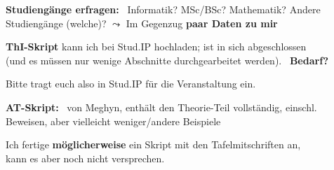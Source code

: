 \begin{frame}
{        \par\medskip
        \textbf{Studiengänge erfragen:}~ Informatik? MSc/BSc? Mathematik? Andere Studiengänge (welche)?
        \qquad
        $\leadsto$ Im Gegenzug \textbf{paar Daten zu mir}
        
        \par\medskip
        \textbf{ThI-Skript} kann ich bei Stud.IP hochladen; ist in sich abgeschlossen \\
        (und es müssen nur wenige Abschnitte durchgearbeitet werden).~ \textbf{Bedarf?}
        
        \par\smallskip
        Bitte tragt euch also in Stud.IP für die Veranstaltung ein.
        
        \par\medskip
        \textbf{AT-Skript:}~ von Meghyn, enthält den Theorie-Teil vollständig, einschl. Beweisen,
        aber vielleicht weniger/andere Beispiele
        
        \par\smallskip
        Ich fertige \textbf{möglicherweise} ein Skript mit den Tafelmitschriften an, \\
        kann es aber noch nicht versprechen.
        
        \par
      }
    \end{frame}

